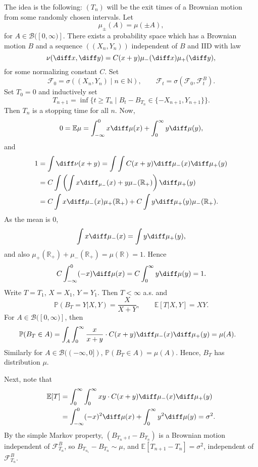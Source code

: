 \documentclass[12pt]{article}
\begin{document}
\begin{proofbox}
	The idea is the following: $(T_n)$ will be the exit times of a Brownian motion from some randomly chosen intervals. Let
	\[
	\mu_{\pm}(A) = \mu(\pm A),
	\]
	for $A \in \mathcal{B}([0, \infty)]$. There exists a probability space which has a Brownian motion $B$ and a sequence $((X_n, Y_n))$ independent of $B$ and IID with law
	\[
	\nu(\diff x, \diff y) = C (x + y) \mu_-(\diff x) \mu_+(\diff y),
	\]
	for some normalizing constant $C$. Set
	\[
	\mathcal{F}_0 = \sigma((X_n, Y_n) \mid n \in \mathbb{N}), \qquad \mathcal{F}_t = \sigma(\mathcal{F}_0, \mathcal{F}_t^B).
	\]
	Set $T_0 = 0$ and inductively set
	\[
		T_{n+1} = \inf\{t \geq T_n \mid B_t - B_{T_n} \in \{-X_{n+1}, Y_{n+1}\}\}.
	\]
	Then $T_n$ is a stopping time for all $n$. Now,
	\[
	0 = \mathbb{E} \mu = \int_{-\infty}^0 x \diff \mu(x) + \int_0^\infty y \diff \mu(y),
	\]
	and
	\begin{align*}
		1 &= \int \diff \nu(x + y) = \int \int C (x + y) \diff \mu_{-}(x) \diff \mu_+(y) \\
		  &= C \int \left( \int x \diff_{\mu_-}(x) + y \mu_{-}(\mathbb{R}_+) \right) \diff \mu_{+}(y) \\
		  &= C \int x \diff \mu_{-}(x) \mu_+(\mathbb{R}_+) + C \int y \diff \mu_+(y) \mu_-(\mathbb{R}_+).
	\end{align*}
	As the mean is 0,
	\[
	\int x \diff \mu_- (x) = \int y \diff \mu_+(y),
	\]
	and also $\mu_+(\mathbb{R}_+) + \mu_-(\mathbb{R}_+) = \mu(\mathbb{R}) = 1$. Hence
	\[
	C \int_{-\infty}^0 (-x) \diff \mu(x) = C \int_0^\infty y \diff \mu(y) = 1.
	\]
	Write $T = T_1$, $X = X_1$, $Y = Y_1$. Then $T < \infty$ a.s. and
	\[
	\mathbb{P}(B_T = Y | X, Y) = \frac{X}{X+Y}, \qquad \mathbb{E}[T|X, Y] = XY.
	\]
	For $A \in \mathcal{B}([0, \infty)]$, then
	\begin{align*}
		\mathbb{P}(B_T \in A) &= \int_A \int_0^\infty \frac{x}{x + y} \cdot C(x + y) \diff \mu_{-}(x) \diff \mu_+(y) = \mu(A).
	\end{align*}
	Similarly for $A \in \mathcal{B}((-\infty, 0])$, $\mathbb{P}(B_T \in A) = \mu(A)$. Hence, $B_T$ has distribution $\mu$.

	Next, note that
	\begin{align*}
		\mathbb{E}[T] &= \int_0^\infty \int_0^\infty xy \cdot C(x + y) \diff \mu_-(x) \diff \mu_+(y) \\
			      &= \int_{-\infty}^0 (-x)^2 \diff \mu(x) + \int_0^\infty y^2 \diff \mu(y) = \sigma^2.
	\end{align*}
	By the simple Markov property, $(B_{T_n + t} - B_{T_n})$ is a Brownian motion independent of $\mathcal{F}_{T_n}^B$, so $B_{T_{n_1}} - B_{T_n} \sim \mu$, and $\mathbb{E}[T_{n+1} - T_n] = \sigma^2$, independent of $\mathcal{F}_{T_n}^B$.
\end{proofbox}
\end{document}
